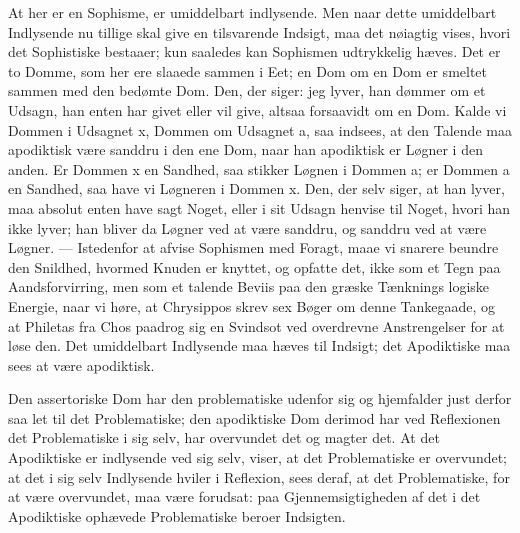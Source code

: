 \documentclass[12pt]{book}
\newcommand{\opage}[1]{\marginnote{\footnotesize\textit{[#1]}}}
\begin{document}
At her er en Sophisme, er umiddelbart indlysende. Men naar dette umiddelbart Indlysende nu tillige skal give en tilsvarende Indsigt, maa det nøiagtig vises, hvori det Sophistiske bestaaer; kun saaledes kan Sophismen udtrykkelig hæves. Det er to Domme, som her ere slaaede sammen i Eet; en Dom om en Dom er smeltet sammen med den bedømte Dom. Den, der siger: jeg lyver, han dømmer om et Udsagn, han enten har givet eller vil give, altsaa forsaavidt om en Dom. Kalde vi Dommen i Udsagnet x, Dommen om Udsagnet a, saa indsees, at den Talende maa apodiktisk være sanddru i den ene Dom, naar han apodiktisk er Løgner i den anden. Er Dommen x en Sandhed, saa stikker Løgnen i Dommen a; er Dommen a en Sandhed, saa have vi Løgneren i Dommen x. Den, der selv siger, at han lyver, maa absolut enten have sagt Noget, eller i sit Udsagn henvise til Noget, hvori han ikke lyver; han bliver da Løgner ved at være sanddru, og sanddru ved at være Løgner. --- Istedenfor at afvise Sophismen med Foragt, maae vi snarere beundre den Snildhed, hvormed Knuden er knyttet, og opfatte det, ikke som et Tegn paa Aandsforvirring, men som et talende Beviis paa den græske Tænknings logiske Energie, naar vi høre, at Chrysippos skrev sex Bøger om denne Tankegaade, og at Philetas fra Chos paadrog sig en Svindsot ved overdrevne Anstrengelser for at løse den. Det umiddelbart
\opage{259}Indlysende maa hæves til Indsigt; det Apodiktiske maa sees at være apodiktisk.

Den assertoriske Dom har den problematiske udenfor sig og hjemfalder just derfor saa let til det Problematiske; den apodiktiske Dom derimod har ved Reflexionen det Problematiske i sig selv, har overvundet det og magter det. At det Apodiktiske er indlysende ved sig selv, viser, at det Problematiske er overvundet; at det i sig selv Indlysende hviler i Reflexion, sees deraf, at det Problematiske, for at være overvundet, maa være forudsat: paa Gjennemsigtigheden af det i det Apodiktiske ophævede Problematiske beroer Indsigten.
\end{document}
